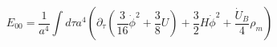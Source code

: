 \begin{equation}
E_{00}=\frac{1}{a^4}\int d\tau a^4\left(\partial_{\tau}\left(\frac{3}{16}\dot \phi^2
+\frac{3}{8}U\right) + \frac{3}{2}H\dot\phi^2 +\frac{\dot U_B}{4}\rho_m\right)
\end{equation}

